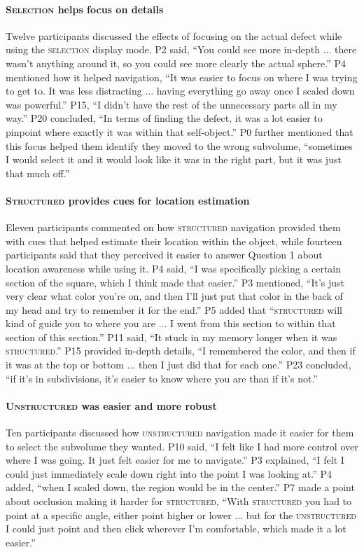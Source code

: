 \paragraph{\textbf{\textsc{Selection} helps focus on details}}
Twelve participants discussed the effects of focusing on the actual defect while using the \textsc{selection} display mode. P2 said, ``You could see more in-depth ... there wasn't anything around it, so you could see more clearly the actual sphere.'' P4 mentioned how it helped navigation, ``It was easier to focus on where I was trying to get to. It was less distracting ... having everything go away once I scaled down was powerful.'' P15, ``I didn't have the rest of the unnecessary parts all in my way.'' P20 concluded, ``In terms of finding the defect, it was a lot easier to pinpoint where exactly it was within that self-object.'' P0 further mentioned that this focus helped them identify they moved to the wrong subvolume, ``sometimes I would select it and it would look like it was in the right part, but it was just that much off.''

\paragraph{\textbf{\textsc{Structured} provides cues for location estimation}}
Eleven participants commented on how \textsc{structured} navigation provided them with cues that helped estimate their location within the object, while fourteen participants said that they perceived it easier to answer Question 1 about location awareness while using it. P4 said, ``I was specifically picking a certain section of the square, which I think made that easier.'' P3 mentioned, ``It's just very clear what color you're on, and then I'll just put that color in the back of my head and try to remember it for the end.'' P5 added that ``\textsc{structured} will kind of guide you to where you are ... I went from this section to within that section of this section.'' P11 said, ``It stuck in my memory longer when it was \textsc{structured}.'' P15 provided in-depth details, ``I remembered the color, and then if it was at the top or bottom ... then I just did that for each one.'' P23 concluded, ``if it's in subdivisions, it's easier to know where you are than if it's not.''

\paragraph{\textbf{\textsc{Unstructured} was easier and more robust}}
Ten participants discussed how \textsc{unstructured} navigation made it easier for them to select the subvolume they wanted. P10 said, ``I felt like I had more control over where I was going. It just felt easier for me to navigate.'' P3 explained, ``I felt I could just immediately scale down right into the point I was looking at.'' P4 added, ``when I scaled down, the region would be in the center.'' P7 made a point about occlusion making it harder for \textsc{structured}, ``With \textsc{structured} you had to point at a specific angle, either point higher or lower ... but for the \textsc{unstructured} I could just point and then click wherever I'm comfortable, which made it a lot easier.''

